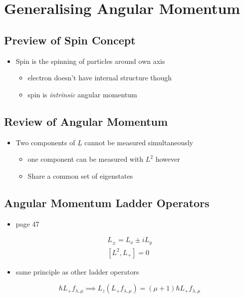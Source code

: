 \documentclass[a4paper,11pt,normalem]{article}
\begin{document}
\section{Generalising Angular Momentum}\label{generalising-angular-momentum}

\subsection{Preview of Spin Concept}\label{preview-of-spin-concept}

\begin{itemize}
\item
  Spin is the spinning of particles around own axis
  \begin{itemize}
  \item
    electron doesn't have internal structure though
  \item
    spin is \emph{intrinsic} angular momentum
  \end{itemize}
\end{itemize}

\subsection{Review of Angular Momentum}\label{review-of-angular-momentum}
\begin{itemize}
\item
  Two components of \(\underline{L}\) cannot be measured simultaneously
  \begin{itemize}
  \item
    one component can be measured with \(L^2\) however
  \item
    Share a common set of eigenstates
  \end{itemize}
\end{itemize}

\subsection{Angular Momentum Ladder Operators}\label{angular-momentum-ladder-operators}

\begin{itemize}
\item
  page 47
\end{itemize}
\[
    \begin{aligned}
    L_{\pm} = L_x \pm iL_y \\
    [L^2, L_+] = 0
    \end{aligned}
\]
\begin{itemize}
\item
  same principle as other ladder operators
\end{itemize}
\[
    \hbar L_+ f_{\lambda, \mu} \implies L_z (L_+ f_{\lambda, \mu}) = (\mu + 1)\hbar L_+ f_{\lambda, \mu}
\]
\end{document}
